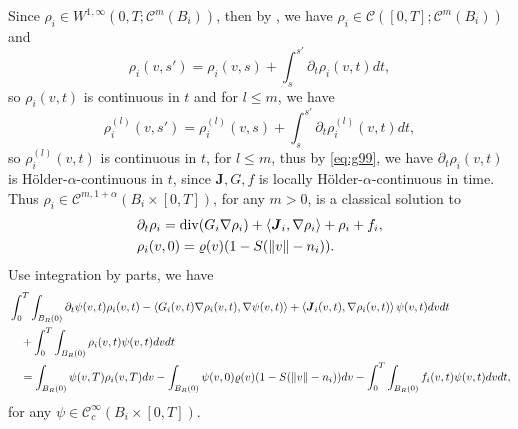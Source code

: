 \documentclass[a4paper, 11pt]{article}
\newcommand{\inner}[2]{\left< #1 , #2 \right>}
\theoremstyle{plain}
\theoremstyle{remark}
\theoremstyle{definition}
\renewcommand{\div}{\mathrm{div}}
\newcommand{\intt}{\int_0^T}
\newcommand{\intr}{\int_{B_R(0)}}
\newcommand{\J}{\boldsymbol{J}}
\begin{document}
		Since $\rho_i\in W^{1,\infty}(0,T;\mathcal{C}^{m}(B_i))$, then by \cite[Section 5.9, Theorem 2]{evans2022partial}, we have $\rho_i\in \mathcal{C}([0,T];\mathcal{C}^{m}(B_i))$ and 
		\begin{equation}\label{eq:112}
			\rho_i(v,s')=\rho_i(v,s)+\int_{s}^{s'}\partial_t\rho_i(v,t)dt,
		\end{equation}
		so $\rho_i(v,t)$ is continuous in $t$ and for $l\leq m$, we have
		\begin{equation}
			\rho_i^{(l)}(v,s')=\rho_i^{(l)}(v,s)+\int_s^{s'}\partial_t\rho_i^{(l)}(v,t)dt,
		\end{equation}
		so $\rho_i^{(l)}(v,t)$ is continuous in $t$, for $l\leq m$, thus by \eqref{eq:g99}, we have $\partial_t\rho_i(v,t)$ is H\"older-$\alpha$-continuous in $t$, since $\boldsymbol{J},G,f$ is locally H\"older-$\alpha$-continuous in time. Thus $\rho_i\in \mathcal{C}^{m,1+\alpha}(B_i\times [0,T])$, for any $m>0$, is a classical solution to 
		\begin{equation}\label{eq:g102}
			\begin{aligned}	&\partial_t\rho_i=\div(G_i\nabla\rho_i)+\inner{\J_i}{\nabla\rho_i}+\rho_i+f_i,\\
				&\rho_i(v,0)=\varrho(v)(1-S(\norm{v}-n_i)).
			\end{aligned}
		\end{equation}
	 Use integration by parts, we have
	\begin{equation}\label{eq:g113}
	\begin{aligned}
		&\intt\intr\partial_t\psi(v,t)\rho_i(v,t)-\inner{G_i(v,t)\nabla\rho_i(v,t)}{\nabla\psi(v,t)}+\inner{\J_i(v,t)}{\nabla\rho_i(v,t)}\psi(v,t)dvdt\\
		&\quad+\intt\intr\rho_i(v,t)\psi(v,t) dvdt\\
		&\quad=\intr\psi(v,T)\rho_i(v,T)dv-\intr\psi(v,0)\varrho(v)(1-S(\norm{v}-n_i)) dv-\intt\intr f_i(v,t)\psi(v,t)dvdt,
	\end{aligned}
\end{equation}
for any $\psi\in\mathcal{C}_c^{\infty}(B_i\times [0,T])$.
		
\end{document}
